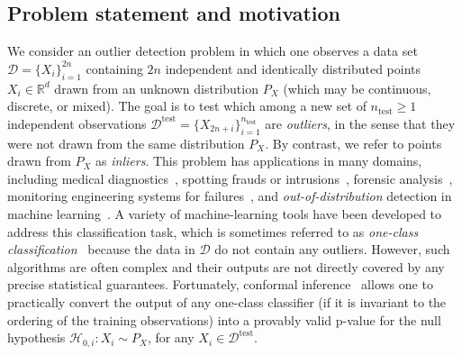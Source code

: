 \subsection{Problem statement and motivation}

We consider an outlier detection problem in which one observes a data set $\mathcal{D}=\{X_i\}_{i=1}^{2n}$ containing $2n$ independent and identically distributed points $X_i \in \mathbb{R}^{d}$ drawn from an unknown distribution $P_{X}$ {(which may be continuous, discrete, or mixed)}.
The goal is to test which among a new set of $n_{\text{test}} \geq 1$ independent observations $\mathcal{D}^{\mathrm{test}} = \{X_{2n+i}\}_{i=1}^{n_{\text{test}}}$ are \emph{outliers}, in the sense that they were not drawn from the same distribution $P_{X}$. By contrast, we refer to points drawn from $P_X$ as \emph{inliers}.
This problem has applications in many domains, including medical diagnostics~\cite{tarassenko1995novelty}, spotting frauds or intrusions~\cite{patcha2007overview}, forensic analysis~\cite{Fortunato2020}, monitoring engineering systems for failures~\cite{Tarassenko2009},
and \emph{out-of-distribution} detection in machine learning~\cite{hendrycks2016baseline, liang2017enhancing, lee2018simple, lee2018training}.
A variety of machine-learning tools have been developed to address this classification task, which is sometimes referred to as \emph{one-class classification}~\cite{moya1993one,pimentel2014review} because the data in $\mathcal{D}$ do not contain any outliers.
However, such algorithms are often complex and their outputs are not directly covered by any precise statistical guarantees. Fortunately, {conformal} inference~\cite{vovk1999machine, vovk2005algorithmic} allows one to practically convert the output {of any} one-class classifier ({if} it is invariant to the ordering of the training observations) into a provably valid p-value for the null hypothesis $\mathcal{H}_{0,i}: X_{i} \sim P_X$, for any $X_i \in \mathcal{D}^{\mathrm{test}}$.

